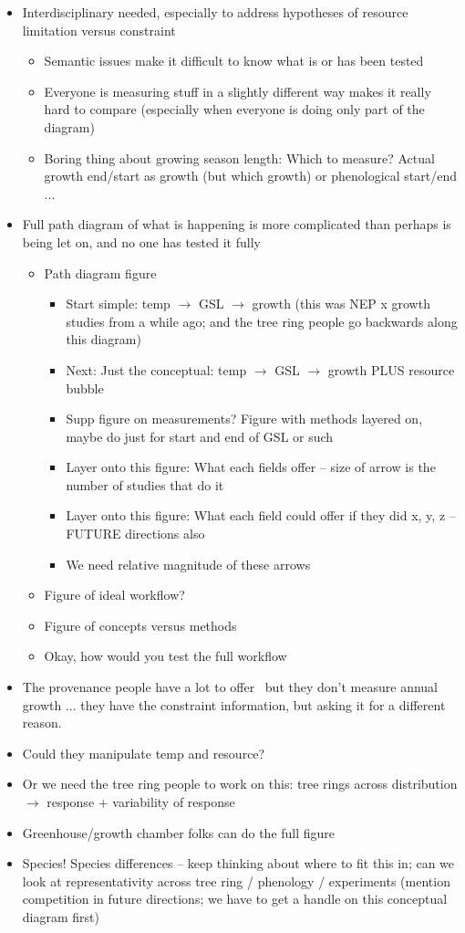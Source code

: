 \documentclass[11pt,letter]{article}
\begin{document}
\begin{itemize}
\item Interdisciplinary needed, especially to address hypotheses of resource limitation versus constraint
\begin{itemize}
\item Semantic issues make it difficult to know what is or has been tested
\item Everyone is measuring stuff in a slightly different way makes it really hard to compare (especially when everyone is doing only part of the diagram)
\item Boring thing about growing season length: Which to measure? Actual growth end/start as growth (but which growth) or phenological start/end ... 
\end{itemize}
\item Full path diagram of what is happening is more complicated than perhaps is being let on, and no one has tested it fully
\begin{itemize}
\item Path diagram figure
\begin{itemize}
\item Start simple: temp $\rightarrow$ GSL $\rightarrow$ growth (this was NEP x growth studies from a while ago; and the tree ring people go backwards along this diagram)
\item Next: Just the conceptual: temp $\rightarrow$ GSL $\rightarrow$ growth PLUS resource bubble
\item Supp figure on measurements? Figure with methods layered on, maybe do just for start and end of GSL or such
\item Layer onto this figure: What each fields offer -- size of arrow is the number of studies that do it
\item Layer onto this figure: What each field could offer if they did x, y, z -- FUTURE directions also
\item We need relative magnitude of these arrows
\end{itemize}
\item Figure of ideal workflow?
\item Figure of concepts versus methods
\item Okay, how would you test the full workflow
\end{itemize}
\item The provenance people have a lot to offer
\ but they don't measure annual growth ... they have the constraint information, but asking it for a different reason. 
\item Could they manipulate temp and resource?
\item Or we need the tree ring people to work on this: tree rings across distribution  $\rightarrow$ response + variability of response
\item Greenhouse/growth chamber folks can do the full figure
\item Species! Species differences -- keep thinking about where to fit this in; can we look at representativity across tree ring / phenology / experiments (mention competition in future directions; we have to get a handle on this conceptual diagram first)
\end{itemize}
\end{document}
